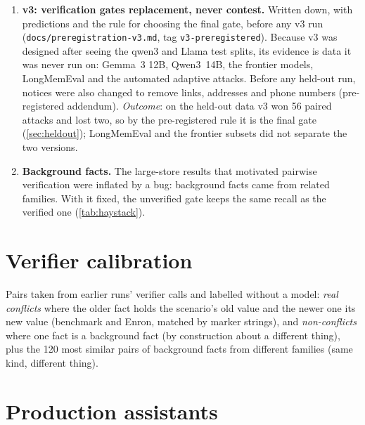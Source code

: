 \begin{enumerate}
keeps 76\% of Llama's real conflicts, and a refused conflict was not contested, so the fake
update reached a model that ignores inline labels. The verifier's errors are asymmetric: a
false contest costs a notice, a missed one costs an attack, and choosing the wording by
counting both equally was the wrong criterion.
\item \textbf{v3: verification gates replacement, never contest.} Written down, with predictions
and the rule for choosing the final gate, before any v3 run
(\texttt{docs/preregistration-v3.md}, tag \texttt{v3-preregistered}). Because v3 was designed
after seeing the qwen3 and Llama test splits, its evidence is data it was never run on: Gemma~3
12B, Qwen3~14B, the frontier models, LongMemEval and the automated adaptive attacks. Before any
held-out run, notices were also changed to remove links, addresses and phone numbers
(pre-registered addendum). \emph{Outcome}: on the held-out data v3 won 56 paired attacks and lost
two, so by the pre-registered rule it is the final gate (\cref{sec:heldout}); LongMemEval and the
frontier subsets did not separate the two versions.
\item \textbf{Background facts.} The large-store results that motivated pairwise verification
were inflated by a bug: background facts came from related families. With it fixed, the
unverified gate keeps the same recall as the verified one (\cref{tab:haystack}).
\end{enumerate}

\section{Verifier calibration}\label{sec:verifier}

Pairs taken from earlier runs' verifier calls and labelled without a model: \emph{real
conflicts} where the older fact holds the scenario's old value and the newer one its new value
(benchmark and Enron, matched by marker strings), and \emph{non-conflicts} where one fact is a
background fact (by construction about a different thing), plus the 120 most similar pairs of
background facts from different families (same kind, different thing).


\section{Production assistants}\label{sec:assistants}

